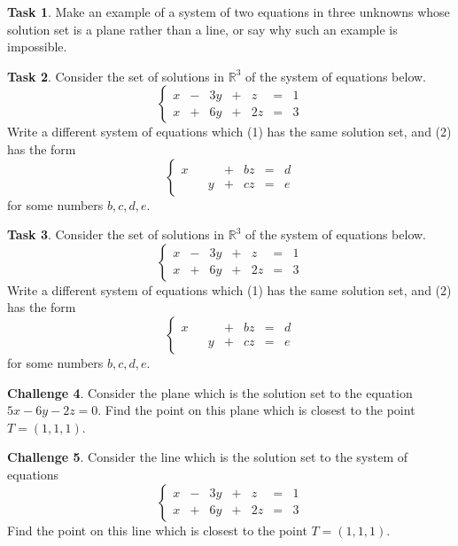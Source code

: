 \documentclass{tufte-book}
\theoremstyle{definition}
\newtheorem{task}{Task}
\newtheorem{challenge}[task]{Challenge}
\begin{document}
\begin{task}
Make an example of a system of two equations in three unknowns whose solution set is a plane rather than a line, or say why such an example is impossible.
\end{task}

\begin{task}
Consider the set of solutions in $\mathbb{R}^3$ of the system of equations below. 
\[
\left\{\begin{array}{rrrrrrr}
x & - & 3y & + & z & = & 1 \\
x & + & 6y & + & 2z & = & 3
\end{array}\right.
\]
Write a different system of equations which (1) has the same solution set, and (2) has the form
\[
\left\{\begin{array}{rrrrrrr}
x &  &  & + & bz & = & d \\
 &  & y & + & cz & = & e
\end{array}\right.
\]
for some numbers $b,c,d,e$.
\end{task}

\begin{task}
Consider the set of solutions in $\mathbb{R}^3$ of the system of equations below. 
\[
\left\{\begin{array}{rrrrrrr}
x & - & 3y & + & z & = & 1 \\
x & + & 6y & + & 2z & = & 3
\end{array}\right.
\]
Write a different system of equations which (1) has the same solution set, and (2) has the form
\[
\left\{\begin{array}{rrrrrrr}
x &  &  & + & bz & = & d \\
 &  & y & + & cz & = & e
\end{array}\right.
\]
for some numbers $b,c,d,e$.
\end{task}

\begin{challenge}
Consider the plane which is the solution set to the equation $5x-6y-2z=0$. Find the point on this plane which is closest to the point $T = (1,1,1)$.
\end{challenge}

\begin{challenge}
Consider the line which is the solution set to the system of equations
\[
\left\{\begin{array}{rrrrrrr}
x & - & 3y & + & z & = & 1 \\
x & + & 6y & + & 2z & = & 3
\end{array}\right.
\]
Find the point on this line which is closest to the point $T = (1,1,1)$.
\end{challenge}
\end{document}
